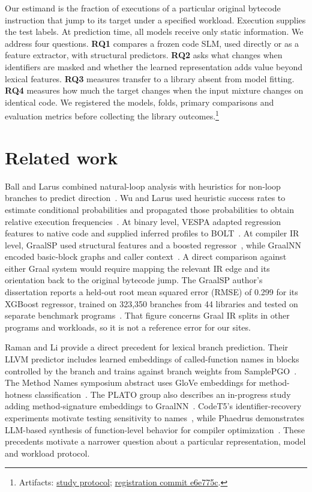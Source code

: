 \documentclass[11pt]{article}
\newcommand{\repocommit}{81d03caebe268d013b3163bcbff31cadabaaec21}
\newcommand{\repourl}{https://github.com/minggu151623/llm_profiling_research}
\newcommand{\repo}[2]{\href{\repourl/blob/\repocommit/#1}{#2}}
\newcommand{\artifacts}[1]{\footnote{Artifacts: #1.}}
\begin{document}
Our estimand is the fraction of executions of a particular original bytecode instruction that jump to its target under a specified workload. Execution supplies the test labels. At prediction time, all models receive only static information. We address four questions. \textbf{RQ1} compares a frozen code SLM, used directly or as a feature extractor, with structural predictors. \textbf{RQ2} asks what changes when identifiers are masked and whether the learned representation adds value beyond lexical features. \textbf{RQ3} measures transfer to a library absent from model fitting. \textbf{RQ4} measures how much the target changes when the input mixture changes on identical code. We registered the models, folds, primary comparisons and evaluation metrics before collecting the library outcomes.\artifacts{\repo{experiments/study/protocol.md}{study protocol}; \href{\repourl/commit/e6e775c96394dac0e91af37b0a60f53cef829379}{registration commit e6e775c}}

\section{Related work}

Ball and Larus combined natural-loop analysis with heuristics for non-loop branches to predict direction~\citep{ball-larus}. Wu and Larus used heuristic success rates to estimate conditional probabilities and propagated those probabilities to obtain relative execution frequencies~\citep{wu-larus}. At binary level, VESPA adapted regression features to native code and supplied inferred profiles to BOLT~\citep{vespa}. At compiler IR level, GraalSP used structural features and a boosted regressor~\citep{graalsp}, while GraalNN encoded basic-block graphs and caller context~\citep{graalnn}. A direct comparison against either Graal system would require mapping the relevant IR edge and its orientation back to the original bytecode jump. The GraalSP author's dissertation reports a held-out root mean squared error (RMSE) of 0.299 for its XGBoost regressor, trained on 323,350 branches from 44 libraries and tested on separate benchmark programs~\citep[Table 6.2]{cugurovic-thesis}. That figure concerns Graal IR splits in other programs and workloads, so it is not a reference error for our sites.

Raman and Li provide a direct precedent for lexical branch prediction. Their LLVM predictor includes learned embeddings of called-function names in blocks controlled by the branch and trains against branch weights from SamplePGO~\citep[\S4.3]{raman-li}. The Method Names symposium abstract uses GloVe embeddings for method-hotness classification~\citep{method-names}. The PLATO group also describes an in-progress study adding method-signature embeddings to GraalNN~\citep{plato-status}. CodeT5's identifier-recovery experiments motivate testing sensitivity to names~\citep{codet5}, while Phaedrus demonstrates LLM-based synthesis of function-level behavior for compiler optimization~\citep{phaedrus}. These precedents motivate a narrower question about a particular representation, model and workload protocol.
\end{document}
